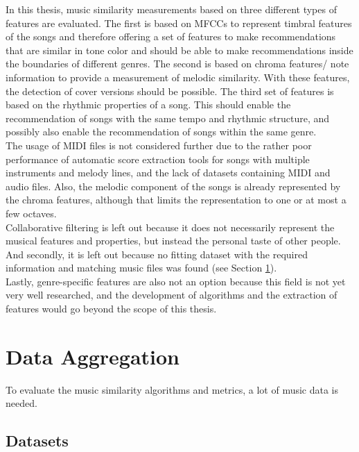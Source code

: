 In this thesis, music similarity measurements based on three different types of features are evaluated. The first is based on MFCCs to represent timbral features of the songs and therefore offering a set of features to make recommendations that are similar in tone color and should be able to make recommendations inside the boundaries of different genres. The second is based on chroma features/ note information to provide a measurement of melodic similarity. With these features, the detection of cover versions should be possible. The third set of features is based on the rhythmic properties of a song. This should enable the recommendation of songs with the same tempo and rhythmic structure, and possibly also enable the recommendation of songs within the same genre.\\
The usage of MIDI files is not considered further due to the rather poor performance of automatic score extraction tools for songs with multiple instruments and melody lines, and the lack of datasets containing MIDI and audio files. Also, the melodic component of the songs is already represented by the chroma features, although that limits the representation to one or at most a few octaves.\\
Collaborative filtering is left out because it does not necessarily represent the musical features and properties, but instead the personal taste of other people. And secondly, it is left out because no fitting dataset with the required information and matching music files was found (see Section \ref{data}).\\
Lastly, genre-specific features are also not an option because this field is not yet very well researched, and the development of algorithms and the extraction of features would go beyond the scope of this thesis.

\section{Data Aggregation}\label{data}

To evaluate the music similarity algorithms and metrics, a lot of music data is needed.

\subsection{Datasets}\label{datasets}


